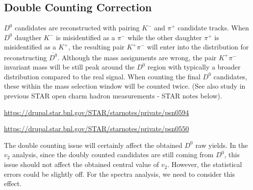 \documentclass[a4paper]{article}
\begin{document}
\subsection{Double Counting Correction}




$D^0$ candidates are reconstructed with pairing $K^-$ and $\pi^+$ candidate tracks. When $D^0$ daugther $K^-$ is misidentified as a $\pi^-$ while the other daughter $\pi^+$ is misidentified as a $K^+$, the resulting pair $K^+\pi^-$ will enter into the distribution for reconstructing $\overline{D^0}$. Although the mass assignments are wrong, the pair $K^+\pi^-$ invariant mass will be still peak around the $D^0$ region with typically a broader distribution compared to the real signal. When counting the final $D^0$ candidates, these within the mass selection window will be counted twice. (See also study in previous STAR open charm hadron measurements - STAR notes below).

\url{https://drupal.star.bnl.gov/STAR/starnotes/private/psn0594}

\url{https://drupal.star.bnl.gov/STAR/starnotes/private/psn0550}

The double counting issue will certainly affect the obtained $D^0$ raw yields. In the $v_2$ analysis, since the doubly counted candidates are still coming from $D^0$, this issue should not affect the obtained central value of $v_2$. However, the statistical errors could be slightly off. For the spectra analysis, we need to consider this effect.
\end{document}
